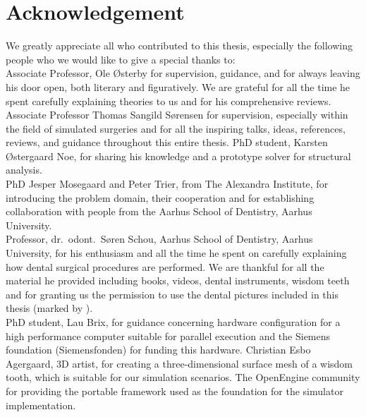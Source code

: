 
\chapter*{Acknowledgement}
We greatly appreciate all who contributed to this thesis,
especially the following people who we would like to give a special
thanks to: \\ 

Associate Professor, Ole Østerby for supervision, guidance, and
for always leaving his door open, both literary and figuratively. We
are grateful for all the time he spent carefully explaining theories
to us and for his comprehensive reviews. 
%
Associate Professor Thomas Sangild Sørensen for supervision, especially within the field
of simulated surgeries and for all the inspiring talks, ideas,
references, reviews, and guidance throughout this entire thesis.
%
PhD student, Karsten Østergaard Noe, for sharing his knowledge and
a prototype solver for structural analysis. \\

PhD Jesper Mosegaard and Peter Trier, from The Alexandra
Institute, for introducing the problem domain, their cooperation and
for establishing collaboration with people from the Aarhus School of
Dentistry, Aarhus University. \\

Professor, dr.~odont.~Søren Schou, Aarhus School of Dentistry, Aarhus
University, for his enthusiasm and all the time he spent on carefully
explaining how dental surgical procedures are performed. We are
thankful for all the material he provided including books, videos,
dental instruments, wisdom teeth and for granting us the permission to
use the dental pictures included in this thesis (marked by \textdagger). \\

PhD student, Lau Brix, for guidance concerning hardware
configuration for a high performance computer suitable for parallel
execution
%
and the Siemens foundation (Siemensfonden) for funding this
hardware.
%
Christian Esbo Agergaard, 3D artist, for creating a three-dimensional
surface mesh of a wisdom tooth, which is suitable for our simulation
scenarios.
%
The OpenEngine community for providing the portable framework used as
the foundation for the simulator implementation.
